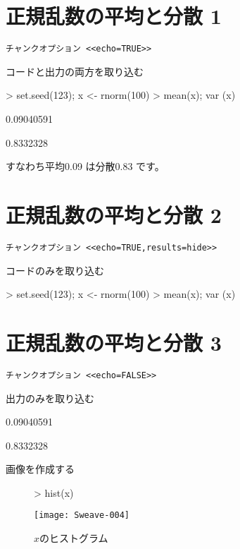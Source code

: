 \documentclass{jsarticle}
\begin{document}
\section {正規乱数の平均と分散 1}


\begin{verbatim}
チャンクオプション <<echo=TRUE>>
\end{verbatim}
コードと出力の両方を取り込む

\begin{Schunk}
\begin{Sinput}
> set.seed(123); x <- rnorm(100)
> mean(x); var (x)
\end{Sinput}
\begin{Soutput}
[1] 0.09040591
\end{Soutput}
\begin{Soutput}
[1] 0.8332328
\end{Soutput}
\end{Schunk}
すなわち平均0.09
は分散0.83 です。

\section {正規乱数の平均と分散 2}

\begin{verbatim}
チャンクオプション <<echo=TRUE,results=hide>>
\end{verbatim}
コードのみを取り込む

\begin{Schunk}
\begin{Sinput}
> set.seed(123); x <- rnorm(100)
> mean(x); var (x)
\end{Sinput}
\end{Schunk}
\section {正規乱数の平均と分散 3}
\begin{verbatim}
チャンクオプション <<echo=FALSE>>
\end{verbatim}
出力のみを取り込む

\begin{Schunk}
\begin{Soutput}
[1] 0.09040591
\end{Soutput}
\begin{Soutput}
[1] 0.8332328
\end{Soutput}
\end{Schunk}

画像を作成する
\begin{figure}[h]
\begin{center}
\begin{Schunk}
\begin{Sinput}
> hist(x)
\end{Sinput}
\end{Schunk}
\texttt{[image: Sweave-004]}
\caption{$x$のヒストグラム}
\label{fig1}
\end{center}
\end{figure}
\end{document}
